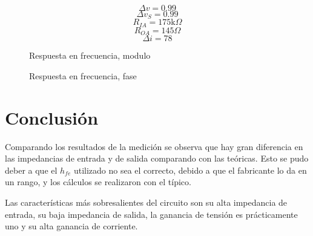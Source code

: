 \documentclass[../../main.tex]{subfiles}
\begin{document}
$$\Delta v = 0.99$$
$$ \Delta v_S =0.99 $$
$$ R_{IA} = 175\mathrm{k}\Omega $$
$$R_{OA}=145\Omega $$
$$\Delta i= 78 $$

\begin{figure}[H]	
	\centering
	\caption{Respuesta en frecuencia, modulo}
\end{figure}

\begin{figure}[H]	
	\centering
	\caption{Respuesta en frecuencia, fase}
\end{figure}


\section{Conclusión}
Comparando los resultados de la medición se observa que hay gran diferencia en las impedancias de entrada y de salida comparando con las te\'oricas. Esto se pudo deber a que el $h_{fe}$ utilizado no sea el correcto, debido a que el fabricante lo da en un rango, y los cálculos se realizaron con el t\'ipico. 
\par Las características más sobresalientes del circuito son su alta impedancia de entrada, su baja impedancia de salida, la ganancia de tensión es prácticamente uno y su alta ganancia de corriente.
\end{document}
